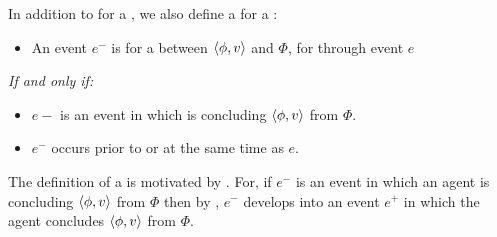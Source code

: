 \begin{note}
  In addition to \wit{} for a \ros{}, we also define a \pwit{} for a \ros{}:

  \begin{definition}
    \label{def:Pwit}%
    \vspace{-\baselineskip}
    \begin{itemize}
    \item
      An event \(e^{-}\) is \emph{} for a \ros{} between \(\langle \phi, v \rangle\) and \(\Phi\), for \vAgent{} through event \(e\)
    \end{itemize}

    \emph{If and only if:}

    \begin{itemize}
    \item
      \(e-\) is an event in which \vAgent{} is concluding \(\langle \phi, v \rangle\) from \(\Phi\).
    \item
      \(e^{-}\) occurs prior to or at the same time as \(e\).
    \end{itemize}
    \vspace{-\baselineskip}
  \end{definition}

  \noindent%
  The definition of a \pwit{} is motivated by \assuPP{}.
  For, if \(e^{-}\) is an event in which an agent is concluding \(\langle \phi, v \rangle\) from \(\Phi\) then by \assuPP{}, \(e^{-}\) develops into an event \(e^{+}\) in which the agent concludes \(\langle \phi, v \rangle\) from \(\Phi\).
\end{note}



\section{\supportII{}}
\label{cha:ros:II}


